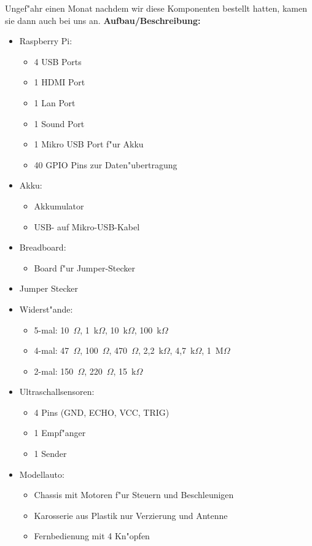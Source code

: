 \documentclass[a4paper,12pt]{article}
\newenvironment{smallitemize}{
	\begin{itemize}
		\setlength{\itemsep}{0pt}
		\setlength{\parskip}{0pt}
		\setlength{\parsep}{0pt}
}
{
	\end{itemize}
}
\begin{document}
Ungef"ahr einen Monat nachdem wir diese Komponenten bestellt hatten, kamen sie dann auch bei uns an. 
\newline
{\bf Aufbau/Beschreibung:}
\begin{smallitemize}
	\item Raspberry Pi:
	\begin{smallitemize}
		\item 4 USB Ports
		\item 1 HDMI Port
		\item 1 Lan Port
		\item 1 Sound Port
		\item 1 Mikro USB Port  f"ur Akku
		\item 40 GPIO Pins zur Daten"ubertragung
	\end{smallitemize}
	\item Akku:
	\begin{smallitemize}
		\item Akkumulator
		\item USB- auf Mikro-USB-Kabel
	\end{smallitemize}
	\item Breadboard:
	\begin{smallitemize}
		\item Board f"ur Jumper-Stecker
	\end{smallitemize}
	\item Jumper Stecker
	\item Widerst"ande:
	\begin{smallitemize}
		\item 5-mal: 10~$ \Omega $, 1~k$ \Omega $, 10~k$ \Omega $, 100~k$ \Omega $
		\item 4-mal: 47~$ \Omega $, 100~$ \Omega $, 470~$ \Omega $, 2,2~k$ \Omega $, 4,7~k$ \Omega $, 1~M$ \Omega $
		\item 2-mal: 150~$ \Omega $, 220~$ \Omega $, 15~k$ \Omega $
	\end{smallitemize}
	\item Ultraschallsensoren:
	\begin{smallitemize}
		\item 4 Pins (GND, ECHO, VCC, TRIG)
		\item 1 Empf"anger
		\item 1 Sender
	\end{smallitemize}
	\item Modellauto:
	\begin{smallitemize}
		\item Chassis mit Motoren f"ur Steuern und Beschleunigen
		\item Karosserie aus Plastik nur Verzierung und Antenne
		\item Fernbedienung mit 4 Kn"opfen
	\end{smallitemize}
\end{smallitemize}
\end{document}

